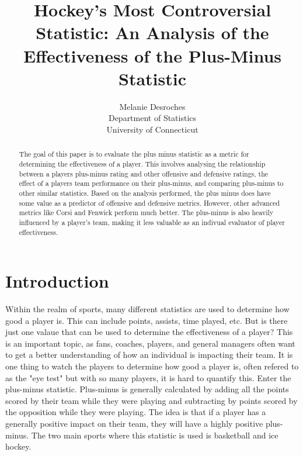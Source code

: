 \documentclass[12pt]{article}
\title{Hockey's Most Controversial Statistic: An Analysis of the Effectiveness of the Plus-Minus Statistic}
\author{Melanie Desroches\\
  Department of Statistics\\
  University of Connecticut
}
\begin{document}
\maketitle

\begin{abstract}
The goal of this paper is to evaluate the plus minus statistic as a metric for determining the effectiveness of a player.
This involves analysing the relationship between a players plus-minus rating and other offensive and defensive ratings,
the effect of a players team performance on their plus-minus, and comparing plus-minus to other similar statistics. Based
on the analysis performed, the plus minus does have some value as a predictor of offensive and defensive metrics. However, other
advanced metrics like Corsi and Fenwick perform much better. The plus-minus is also heavily influenced by a player's team, making it 
less valuable as an indivual evaluator of player effectiveness.
\end{abstract}

\doublespacing

\section{Introduction}
\label{sec:intro}


Within the realm of sports, many different statistics are used to determine how good a player is. This can include points,
assists, time played, etc. But is there just one valaue that can be used to determine the effectiveness of a player? This is an 
important topic, as fans, coaches, players, and general managers often want to get a better understanding of how an individual is
impacting their team. It is one thing to watch the players to determine how good a player is, often refered to as the "eye test" but 
with so many players, it is hard to quantify this. Enter the plus-minus statistic. Plus-minus is generally calculated by adding all the points
scored by their team while they were playing and subtracting by points scored by the opposition while they were playing. The idea is that 
if a player has a generally positive impact on their team, they will have a highly positive plus-minus. The two main sports where this
statistic is used is basketball and ice hockey. 
\end{document}
